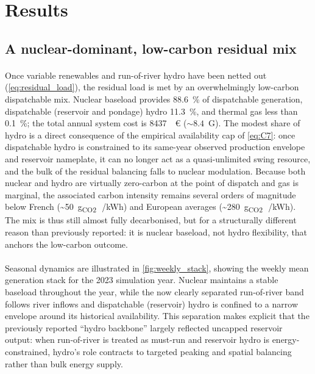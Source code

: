 \documentclass[12pt]{article}
\newcommand{\EURM}[1]{\SI{#1}{\mega\euro}} %
\begin{document}

\section{Results}\label{sec:results}

\subsection{A nuclear-dominant, low-carbon residual mix}\label{subsec:hydro_resilience}

\paragraph{}
Once variable renewables and run-of-river hydro have been netted out (\cref{eq:residual_load}), the residual load is met by an overwhelmingly low-carbon dispatchable mix. Nuclear baseload provides \SI{88.6}{\percent} of dispatchable generation, dispatchable (reservoir and pondage) hydro \SI{11.3}{\percent}, and thermal gas less than \SI{0.1}{\percent}; the total annual system cost is \EURM{8437} (\(\sim 8.4\)~G\texteuro). The modest share of hydro is a direct consequence of the empirical availability cap of \cref{eq:C7}: once dispatchable hydro is constrained to its same-year observed production envelope and reservoir nameplate, it can no longer act as a quasi-unlimited swing resource, and the bulk of the residual balancing falls to nuclear modulation. Because both nuclear and hydro are virtually zero-carbon at the point of dispatch and gas is marginal, the associated carbon intensity remains several orders of magnitude below French (\textasciitilde\SI{50}{g_{CO2}\,/kWh}) and European averages (\textasciitilde\SI{280}{g_{CO2}\,/kWh}). The mix is thus still almost fully decarbonised, but for a structurally different reason than previously reported: it is nuclear baseload, not hydro flexibility, that anchors the low-carbon outcome.

\paragraph{}
Seasonal dynamics are illustrated in \cref{fig:weekly_stack}, showing the weekly mean generation stack for the 2023 simulation year. Nuclear maintains a stable baseload throughout the year, while the now clearly separated run-of-river band follows river inflows and dispatchable (reservoir) hydro is confined to a narrow envelope around its historical availability. This separation makes explicit that the previously reported ``hydro backbone'' largely reflected uncapped reservoir output: when run-of-river is treated as must-run and reservoir hydro is energy-constrained, hydro's role contracts to targeted peaking and spatial balancing rather than bulk energy supply.
\end{document}

